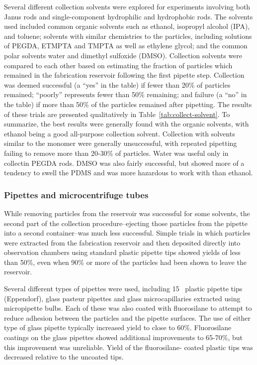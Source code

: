 Several different collection solvents were explored for experiments involving both Janus rods and single-component
hydrophilic and hydrophobic rods.  The solvents used included 
common organic solvents such as ethanol,
isopropyl alcohol (IPA), and toluene; solvents with similar chemistries to the particles, including solutions of 
PEGDA, ETMPTA and TMPTA as well as ethylene glycol; and the common polar solvents water and dimethyl sulfoxide (DMSO).
Collection solvents were compared to each other based on estimating the fraction of particles which remained in the
fabrication reservoir following the first pipette step.  Collection was deemed successful (a 
``yes'' in the table) if fewer than 20\% of particles remained; ``poorly'' represents fewer than 50\% remaining; and 
failure (a ``no'' in the table) if more than 50\% of the particles remained after pipetting.
The results of these trials are presented qualitatively in Table~\ref{tab:collect-solvent}.  To summarize, the best
results were generally found with the organic solvents, with ethanol being a good all-purpose collection solvent.
Collection with solvents similar to the monomer were generally unsuccessful, with repeated pipetting failing to 
remove more than 20-30\% of particles.  Water was useful only in collectin PEGDA rods.
DMSO was also fairly successful, but showed more of a tendency to swell the PDMS
and was more hazardous to work with than ethanol.

\subsubsection{Pipettes and microcentrifuge tubes}

While removing particles from the reservoir was successful for some solvents, the second part of the collection 
procedure--ejecting those particles from the pipette into a second container--was much less successful.  
Simple trials in which particles were extracted from the fabrication reservoir and then deposited directly into 
observation chambers using standard plastic pipette tips showed yields of less than 50\%, 
even when 90\% or more of the particles had been shown to leave the reservoir.  


Several different types of pipettes were used, including 15 \uL~plastic pipette tips (Eppendorf), glass pasteur pipettes and
glass microcapillaries extracted using micropipette bulbs.  Each of these 
was also coated with fluorosilane to attempt to reduce adhesion between the particles and the pipette surfaces.
The use of either type of glass pipette typically increased yield to close to 60\%. Fluorosilane coatings on the glass
pipettes showed additional improvements to 65-70\%, but this improvement was unreliable.  Yield of the fluorosilane-
coated plastic tips was decreased relative to the uncoated tips.


